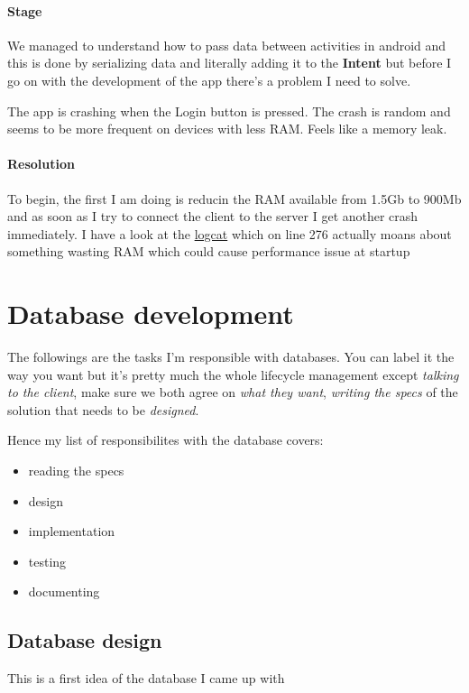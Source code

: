 \documentclass[a4paper,12pt]{book}
\begin{document}
\clearpage

\subsection{Stage}


We managed to understand how to pass data between activities in android and this is done by serializing data and literally adding it to the \textbf{Intent} but before I go on with the development of the app there's a problem I need to solve.

The app is crashing when the Login button is pressed. The crash is random and seems to be more frequent on devices with less RAM. Feels like a memory leak.

\subsection{Resolution}

To begin, the first I am doing is reducin the RAM available from 1.5Gb to 900Mb and as soon as I try to connect the client to the server I get another crash immediately. I have a look at the \href{run:./verbose-logcat}{logcat} which on line 276 actually moans about something wasting RAM which could cause performance issue at startup




\part{Database development}

The followings are the tasks I'm responsible with databases. You can label it the way you want but it's pretty much the whole lifecycle management except \emph{talking to the client}, make sure we both agree on \emph{what they want}, \emph{writing the specs} of the solution that needs to be \emph{designed}.

Hence my list of responsibilites with the database covers:

\begin{itemize}
\item {reading the specs}
\item design
\item implementation
\item testing 
\item documenting
\end{itemize}

\clearpage

\chapter{Database design}
This is a first idea of the database I came up with
\end{document}
